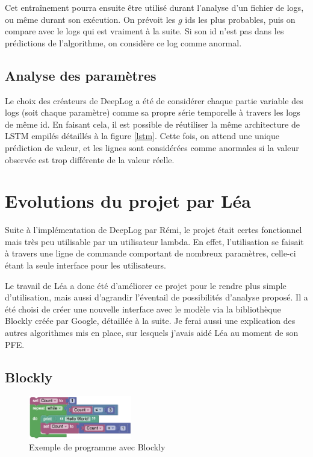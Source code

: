 \documentclass[openany, 11pt]{memoir}
\begin{document}
\bigskip
Cet entraînement pourra ensuite être utilisé durant l'analyse d'un fichier de \glspl{log}, ou même durant son exécution. On prévoit les $g$ ids les plus probables, puis on compare avec le logs qui est vraiment à la suite. Si son id n'est pas dans les prédictions de l'algorithme, on considère ce log comme anormal.

\subsection{Analyse des paramètres}

Le choix des créateurs de DeepLog a été de considérer chaque partie variable des \glspl{log} (soit chaque paramètre) comme sa propre série temporelle à travers les logs de même id. En faisant cela, il est possible de réutiliser la même architecture de \gls{LSTM} empilés détaillés à la figure \ref{lstm}. Cette fois, on attend une unique prédiction de valeur, et les lignes sont considérées comme anormales si la valeur observée est trop différente de la valeur réelle.

\newpage
\section{Evolutions du projet par Léa}

Suite à l'implémentation de DeepLog par Rémi, le projet était certes fonctionnel mais très peu utilisable par un utilisateur lambda. En effet, l'utilisation se faisait à travers une ligne de commande comportant de nombreux paramètres, celle-ci étant la seule interface pour les utilisateurs.

Le travail de Léa a donc été d'améliorer ce projet pour le rendre plus simple d'utilisation, mais aussi d'agrandir l'éventail de possibilités d'analyse proposé. Il a été choisi de créer une nouvelle interface avec le modèle via la bibliothèque Blockly créée par Google, détaillée à la suite. Je ferai aussi une explication des autres algorithmes mis en place, sur lesquels j'avais aidé Léa au moment de son PFE.

\subsection{Blockly}


\begin{figure}[ht]
	\centering
	\includegraphics[width=0.4\textwidth]{images/blockly.png}
	\caption{Exemple de programme avec Blockly}
	\label{blockly}
\end{figure}
\end{document}
